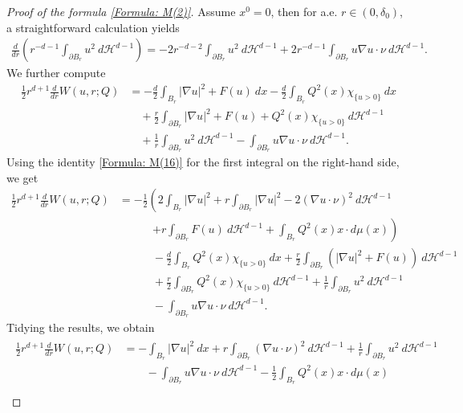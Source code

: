 \documentclass[11pt,reqno]{amsart}
\begin{document}
\begin{proof}[Proof of the formula \eqref{Formula: M(2)}]
	Assume $x^{0}=0$, then for a.e. $r\in(0,\delta_{0})$, a straightforward calculation yields
	\begin{align}\label{Formula: M(17')}
	    \frac{d}{dr}\left(r^{-d-1}\int_{\partial B_{r}}u^{2}\:d\mathcal{H}^{d-1}\right)=-2r^{-d-2}\int_{\partial B_{r}}u^{2}\:d\mathcal{H}^{d-1}+2r^{-d-1}\int_{\partial B_{r}}u\nabla u\cdot\nu\:d\mathcal{H}^{d-1}.
	\end{align}
	We further compute
	\begin{align*}
		\frac{1}{2}r^{d+1}\frac{d}{dr}W(u,r;Q)&=-\frac{d}{2}\int_{B_{r}}|\nabla u|^{2}+F(u)\:dx-\frac{d}{2}\int_{B_{r}}Q^{2}(x)\chi_{\{u>0\}}\:dx\\
		&\quad+\frac{r}{2}\int_{\partial B_{r}}|\nabla u|^{2}+F(u)+Q^{2}(x)\chi_{\{u>0\}}\:d\mathcal{H}^{d-1}\\
		&\quad+\frac{1}{r}\int_{\partial B_{r}}u^{2}\:d\mathcal{H}^{d-1}-\int_{\partial B_{r}}u\nabla u\cdot\nu\:d\mathcal{H}^{d-1}.
	\end{align*}
    Using the identity \eqref{Formula: M(16)} for the first integral on the right-hand side, we get
    \begin{align*}
    	\frac{1}{2}r^{d+1}\frac{d}{dr}W(u,r;Q)&=-\frac{1}{2}\left(2\int_{B_{r}}|\nabla u|^{2}+r\int_{\partial B_{r}}|\nabla u|^{2}-2(\nabla u\cdot\nu)^{2}\:d\mathcal{H}^{d-1}\right.\\
    	&\qquad\quad\left.+r\int_{\partial B_{r}}F(u)\:d\mathcal{H}^{d-1}+\int_{B_{r}}Q^{2}(x)x\cdot d\mu(x)\right)\\
    	&\qquad\quad-\frac{d}{2}\int_{B_{r}}Q^{2}(x)\chi_{\{u>0\}}\:dx+\frac{r}{2}\int_{\partial B_{r}}(|\nabla u|^{2}+F(u))\:d\mathcal{H}^{d-1}\\
    	&\qquad\quad+\frac{r}{2}\int_{\partial B_{r}}Q^{2}(x)\chi_{\{u>0\}}\:d\mathcal{H}^{d-1}+\frac{1}{r}\int_{\partial B_{r}}u^{2}\:d\mathcal{H}^{d-1}\\
    	&\qquad\quad-\int_{\partial B_{r}}u\nabla u\cdot\nu\:d\mathcal{H}^{d-1}.
    \end{align*}
    Tidying the results, we obtain
    \begin{align}\label{Formula: M(18)}
    	\begin{alignedat}{3}
    		\frac{1}{2}r^{d+1}\frac{d}{dr}W(u,r;Q)&=-\int_{B_{r}}|\nabla u|^{2}\:dx+r\int_{\partial B_{r}}(\nabla u\cdot\nu)^{2}\:d\mathcal{H}^{d-1}+\frac{1}{r}\int_{\partial B_{r}}u^{2}\:d\mathcal{H}^{d-1}\\
    		&\qquad-\int_{\partial B_{r}}u\nabla u\cdot\nu\:d\mathcal{H}^{d-1}-\frac{1}{2}\int_{B_{r}}Q^{2}(x)x\cdot d\mu(x)\\

\end{alignedat}
\end{align}
\end{proof}
\end{document}
